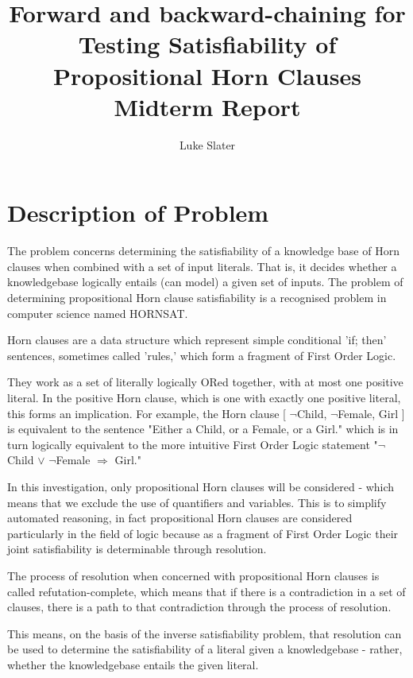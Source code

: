 \documentclass{article}
\begin{document}
\title{Forward and backward-chaining for Testing Satisfiability of Propositional Horn Clauses \protect\\ Midterm Report}
\author{Luke Slater}

\maketitle

\section{Description of Problem}

The problem concerns determining the satisfiability of a knowledge base of Horn
clauses when combined with a set of input literals. That is, it decides whether
a knowledgebase logically entails (can model) a given set of inputs. The problem
of determining propositional Horn clause satisfiability is a recognised problem 
in computer science named HORNSAT.\cite{hornsat}

Horn clauses are a data structure which represent simple conditional 'if; then'
sentences, sometimes called 'rules,' which form a fragment of First Order Logic.\cite{horn}

They work as a set of literally logically ORed together, with at most one
positive literal. In the positive Horn clause, which is one with exactly one
positive literal, this forms an implication. For example, the Horn clause 
[ $\neg$Child, $\neg$Female, Girl ] is equivalent to the sentence "Either a
Child, or a Female, or a Girl." which is in turn logically equivalent to the
more intuitive First Order Logic statement 
"$\neg$Child $\vee$ $\neg$Female $\Rightarrow$ Girl."

In this investigation, only propositional Horn clauses will be considered -
which means that we exclude the use of quantifiers and variables. This is to
simplify automated reasoning, in fact propositional Horn clauses are considered
particularly in the field of logic because as a fragment of First Order Logic 
their joint satisfiability is determinable through resolution.

The process of resolution when concerned with propositional Horn clauses is
called refutation-complete\cite{refcomp}, which means that if there is a
contradiction in a set of clauses, there is a path to that contradiction through
the process of resolution.\cite{resolution}

This means, on the basis of the inverse satisfiability problem\cite{invsat},
that resolution can be used to determine the satisfiability of a
literal given a knowledgebase - rather, whether the knowledgebase entails the
given literal.
\end{document}
